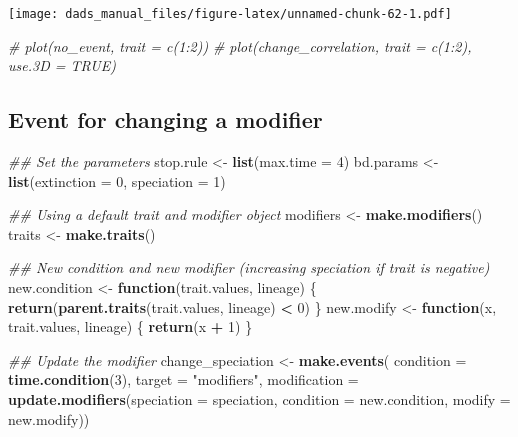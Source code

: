 \documentclass[]{book}
\newenvironment{Shaded}{\begin{snugshade}}{\end{snugshade}}
\newcommand{\CommentTok}[1]{\textcolor[rgb]{0.56,0.35,0.01}{\textit{#1}}}
\newcommand{\ControlFlowTok}[1]{\textcolor[rgb]{0.13,0.29,0.53}{\textbf{#1}}}
\newcommand{\DataTypeTok}[1]{\textcolor[rgb]{0.13,0.29,0.53}{#1}}
\newcommand{\DecValTok}[1]{\textcolor[rgb]{0.00,0.00,0.81}{#1}}
\newcommand{\KeywordTok}[1]{\textcolor[rgb]{0.13,0.29,0.53}{\textbf{#1}}}
\newcommand{\NormalTok}[1]{#1}
\newcommand{\OperatorTok}[1]{\textcolor[rgb]{0.81,0.36,0.00}{\textbf{#1}}}
\newcommand{\StringTok}[1]{\textcolor[rgb]{0.31,0.60,0.02}{#1}}
\begin{document}
\texttt{[image: dads\_manual\_files/figure-latex/unnamed-chunk-62-1.pdf]}

\begin{Shaded}
\begin{Highlighting}[]
\CommentTok{# plot(no_event, trait = c(1:2))}
\CommentTok{# plot(change_correlation, trait = c(1:2), use.3D = TRUE)}
\end{Highlighting}
\end{Shaded}

\hypertarget{event-for-changing-a-modifier}{%
\subsection{Event for changing a modifier}\label{event-for-changing-a-modifier}}

\begin{Shaded}
\begin{Highlighting}[]
\CommentTok{## Set the parameters}
\NormalTok{stop.rule <-}\StringTok{ }\KeywordTok{list}\NormalTok{(}\DataTypeTok{max.time =} \DecValTok{4}\NormalTok{)}
\NormalTok{bd.params <-}\StringTok{ }\KeywordTok{list}\NormalTok{(}\DataTypeTok{extinction =} \DecValTok{0}\NormalTok{, }\DataTypeTok{speciation =} \DecValTok{1}\NormalTok{)}

\CommentTok{## Using a default trait and modifier object}
\NormalTok{modifiers <-}\StringTok{ }\KeywordTok{make.modifiers}\NormalTok{()}
\NormalTok{traits <-}\StringTok{ }\KeywordTok{make.traits}\NormalTok{()}

\CommentTok{## New condition and new modifier (increasing speciation if trait is negative)}
\NormalTok{new.condition <-}\StringTok{ }\ControlFlowTok{function}\NormalTok{(trait.values, lineage) \{}
    \KeywordTok{return}\NormalTok{(}\KeywordTok{parent.traits}\NormalTok{(trait.values, lineage) }\OperatorTok{<}\StringTok{ }\DecValTok{0}\NormalTok{)}
\NormalTok{\}}
\NormalTok{new.modify    <-}\StringTok{ }\ControlFlowTok{function}\NormalTok{(x, trait.values, lineage) \{}
  \KeywordTok{return}\NormalTok{(x }\OperatorTok{+}\StringTok{ }\DecValTok{1}\NormalTok{)}
\NormalTok{\}}

\CommentTok{## Update the modifier}
\NormalTok{change_speciation <-}\StringTok{ }\KeywordTok{make.events}\NormalTok{(}
    \DataTypeTok{condition    =} \KeywordTok{time.condition}\NormalTok{(}\DecValTok{3}\NormalTok{),}
    \DataTypeTok{target       =} \StringTok{"modifiers"}\NormalTok{,}
    \DataTypeTok{modification =} \KeywordTok{update.modifiers}\NormalTok{(}\DataTypeTok{speciation =}\NormalTok{ speciation,}
                                    \DataTypeTok{condition  =}\NormalTok{ new.condition,}
                                    \DataTypeTok{modify     =}\NormalTok{ new.modify))}


\end{Highlighting}
\end{Shaded}
\end{document}
